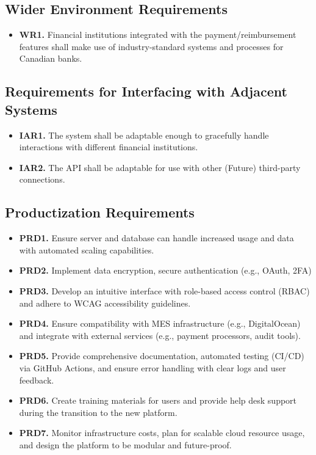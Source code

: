 \documentclass[12pt]{article}
\begin{document}
\subsection{Wider Environment Requirements}
\begin{itemize}
    \item \textbf{WR1.} Financial institutions integrated with the payment/reimbursement features shall make use of industry-standard systems and processes for Canadian banks.
\end{itemize}

\subsection{Requirements for Interfacing with Adjacent Systems}
\begin{itemize}
    \item \textbf{IAR1.} The system shall be adaptable enough to gracefully handle interactions with different financial institutions.
    \item \textbf{IAR2.} The API shall be adaptable for use with other (Future) third-party connections.
\end{itemize}

\subsection{Productization Requirements}
\begin{itemize}
    \item \textbf{PRD1.} Ensure server and database can handle increased usage and data with automated scaling capabilities.
    \item \textbf{PRD2.} Implement data encryption, secure authentication (e.g., OAuth, 2FA)
    \item \textbf{PRD3.} Develop an intuitive interface with role-based access control (RBAC) and adhere to WCAG accessibility guidelines.
    \item \textbf{PRD4.} Ensure compatibility with MES infrastructure (e.g., DigitalOcean) and integrate with external services (e.g., payment processors, audit tools).
    \item \textbf{PRD5.} Provide comprehensive documentation, automated testing (CI/CD) via GitHub Actions, and ensure error handling with clear logs and user feedback.
    \item \textbf{PRD6.} Create training materials for users and provide help desk support during the transition to the new platform.
    \item \textbf{PRD7.} Monitor infrastructure costs, plan for scalable cloud resource usage, and design the platform to be modular and future-proof.
\end{itemize}
\end{document}
